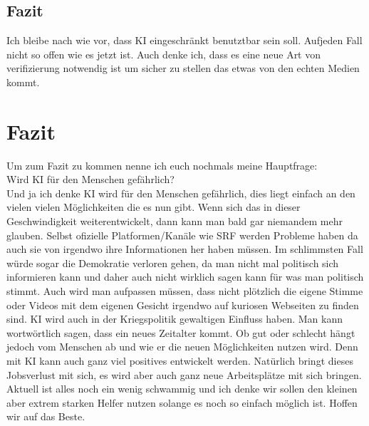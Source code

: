 \subsection{Fazit}
Ich bleibe nach wie vor, dass KI eingeschränkt benutztbar sein soll. Aufjeden Fall nicht so offen wie es jetzt ist. Auch denke ich, dass es eine neue Art von verifizierung notwendig ist um sicher zu stellen das etwas von den echten Medien kommt.

\newpage
\section{Fazit}
Um zum Fazit zu kommen nenne ich euch nochmals meine Hauptfrage:
\\
Wird KI für den Menschen gefährlich?
\\
Und ja ich denke KI wird für den Menschen gefährlich, dies liegt einfach an den vielen vielen Möglichkeiten die es nun gibt.
Wenn sich das in dieser Geschwindigkeit weiterentwickelt, dann kann man bald gar niemandem mehr glauben. Selbst ofizielle Platformen/Kanäle wie SRF werden Probleme haben da auch sie von irgendwo ihre Informationen her haben müssen.
Im schlimmsten Fall würde sogar die Demokratie verloren gehen, da man nicht mal politisch sich informieren kann und daher auch nicht wirklich sagen kann für was man politisch stimmt.
Auch wird man aufpassen müssen, dass nicht plötzlich die eigene Stimme oder Videos mit dem eigenen Gesicht irgendwo auf kuriosen Webseiten zu finden sind. KI wird auch in der Kriegspolitik gewaltigen Einfluss haben.
Man kann wortwörtlich sagen, dass ein neues Zeitalter kommt. Ob gut oder schlecht hängt jedoch vom Menschen ab und wie er die neuen Möglichkeiten nutzen wird. Denn mit KI kann auch ganz viel positives entwickelt werden. Natürlich bringt dieses Jobsverlust mit sich, es wird aber auch ganz neue Arbeitsplätze mit sich bringen.
Aktuell ist alles noch ein wenig schwammig und ich denke wir sollen den kleinen aber extrem starken Helfer nutzen solange es noch so einfach möglich ist.
Hoffen wir auf das Beste.

